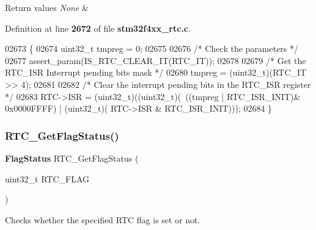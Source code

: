 \begin{DoxyRetVals}{Return values}
{\em None} & \\
\hline
\end{DoxyRetVals}


Definition at line \textbf{ 2672} of file \textbf{ stm32f4xx\+\_\+rtc.\+c}.


\begin{DoxyCode}
02673 \{
02674   uint32\_t tmpreg = 0;
02675 
02676   \textcolor{comment}{/* Check the parameters */}
02677   assert_param(IS_RTC_CLEAR_IT(RTC\_IT));
02678 
02679   \textcolor{comment}{/* Get the RTC\_ISR Interrupt pending bits mask */}
02680   tmpreg = (uint32\_t)(RTC\_IT >> 4);
02681 
02682   \textcolor{comment}{/* Clear the interrupt pending bits in the RTC\_ISR register */}
02683   RTC->ISR = (uint32\_t)((uint32\_t)(~((tmpreg | RTC_ISR_INIT)& 0x0000FFFF) | (uint32\_t)(
      RTC->ISR & RTC_ISR_INIT))); 
02684 \}
\end{DoxyCode}
\mbox{\label{group__RTC__Group13_gaf2a7f11aa7160e95650fd10845e7780b}} 
\subsubsection{R\+T\+C\+\_\+\+Get\+Flag\+Status()}
{\footnotesize\ttfamily \textbf{ Flag\+Status} R\+T\+C\+\_\+\+Get\+Flag\+Status (\begin{DoxyParamCaption}\item[{uint32\+\_\+t}]{R\+T\+C\+\_\+\+F\+L\+AG }\end{DoxyParamCaption})}



Checks whether the specified R\+TC flag is set or not. 


